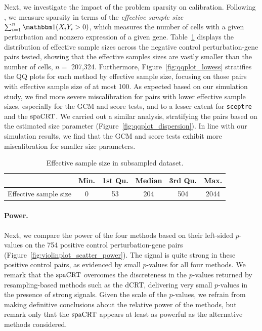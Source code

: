 \documentclass[12pt]{article}
\theoremstyle{definition}
\newcommand{\indicator}{\mathbbm 1}						%
\newcommand{\spacrt}{\textnormal{spaCRT}}               %
\begin{document}
Next, we investigate the impact of the problem sparsity on calibration. Following \citep{Barry2024}, we measure sparsity in terms of the \textit{effective sample size} $\sum_{i = 1}^n \indicator(X_{i} Y_{i} > 0)$, which measures the number of cells with a given perturbation and nonzero expression of a given gene. Table~\ref{tab:sparsity_level_ess} displays the distribution of effective sample sizes across the negative control perturbation-gene pairs tested, showing that the effective samples sizes are vastly smaller than the number of cells, $n =$ 207,324. Furthermore, Figure~\ref{fig:qqplot_lowess} stratifies the QQ plots for each method by effective sample size, focusing on those pairs with effective sample size of at most 100. As expected based on our simulation study, we find more severe miscalibration for pairs with lower effective sample sizes, especially for the GCM and score tests, and to a lesser extent for \verb|sceptre| and the $\spacrt$. We carried out a similar analysis, stratifying the pairs based on the estimated size parameter (Figure~\ref{fig:qqplot_dispersion}). In line with our simulation results, we find that the GCM and score tests exhibit more miscalibration for smaller size parameters. 


\begin{table}[h!]
  \centering
  \begin{tabular}[t]{lccccc}
  \toprule
    & Min. & 1st Qu. & Median & 3rd Qu. & Max.\\
  \midrule
  Effective sample size & 0   &   53   &  204  &   504  & 2044 \\
  \bottomrule
  \end{tabular}
  \caption{Effective sample size in subsampled dataset.}
  \label{tab:sparsity_level_ess}
\end{table}

\paragraph{Power.}

Next, we compare the power of the four methods based on their left-sided $p$-values on the 754 positive control perturbation-gene pairs (Figure~\ref{fig:violinplot_scatter_power}). The signal is quite strong in these positive control pairs, as evidenced by small $p$-values for all four methods. We remark that the $\spacrt$ overcomes the discreteness in the $p$-values returned by resampling-based methods such as the dCRT, delivering very small $p$-values in the presence of strong signals. Given the scale of the $p$-values, we refrain from making definitive conclusions about the relative power of the methods, but remark only that the $\spacrt$ appears at least as powerful as the alternative methods considered.
\end{document}
